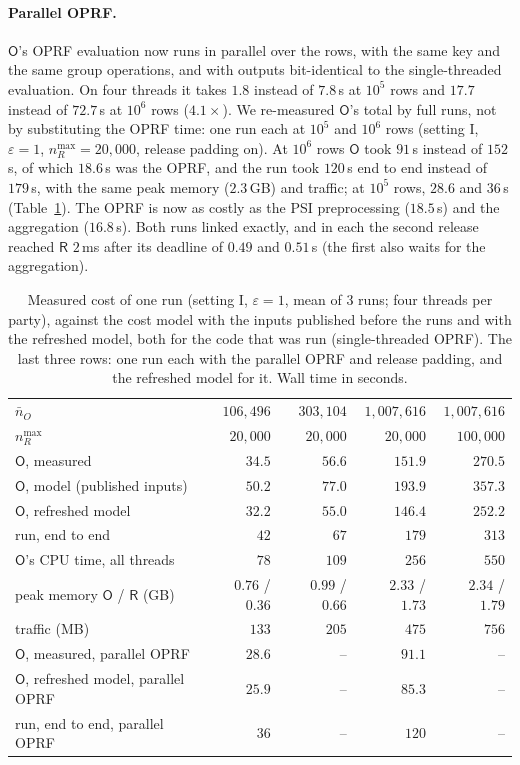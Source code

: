 \documentclass[11pt]{article}
\theoremstyle{definition}
\theoremstyle{plain}
\newcommand{\Party}[1]{\textsf{#1}}
\newcommand{\Rp}{\Party{R}}
\newcommand{\Op}{\Party{O}}
\begin{document}
\paragraph{Parallel OPRF.} $\Op$'s OPRF evaluation now runs in parallel over the rows, with the same key and the same group operations, and with outputs bit-identical to the single-threaded evaluation. On four threads it takes $1.8$ instead of $7.8$\,s at $10^5$ rows and $17.7$ instead of $72.7$\,s at $10^6$ rows ($4.1\times$). We re-measured $\Op$'s total by full runs, not by substituting the OPRF time: one run each at $10^5$ and $10^6$ rows (setting I, $\varepsilon = 1$, $n_R^{\max} = 20{,}000$, release padding on). At $10^6$ rows $\Op$ took $91$\,s instead of $152$\,s, of which $18.6$\,s was the OPRF, and the run took $120$\,s end to end instead of $179$\,s, with the same peak memory ($2.3$\,GB) and traffic; at $10^5$ rows, $28.6$ and $36$\,s (Table~\ref{tab:cost_large}). The OPRF is now as costly as the PSI preprocessing ($18.5$\,s) and the aggregation ($16.8$\,s). Both runs linked exactly, and in each the second release reached $\Rp$ $2$\,ms after its deadline of $0.49$ and $0.51$\,s (the first also waits for the aggregation).

\begin{table}[ht]
\centering\small
\caption{Measured cost of one run (setting I, $\varepsilon = 1$, mean of 3 runs; four threads per party), against the cost model with the inputs published before the runs and with the refreshed model, both for the code that was run (single-threaded OPRF). The last three rows: one run each with the parallel OPRF and release padding, and the refreshed model for it. Wall time in seconds.}
\label{tab:cost_large}
\begin{tabular}{@{}lrrrr@{}}
\toprule
$\bar n_O$ & $106{,}496$ & $303{,}104$ & $1{,}007{,}616$ & $1{,}007{,}616$ \\
$n_R^{\max}$ & $20{,}000$ & $20{,}000$ & $20{,}000$ & $100{,}000$ \\
\midrule
$\Op$, measured & $34.5$ & $56.6$ & $151.9$ & $270.5$ \\
$\Op$, model (published inputs) & $50.2$ & $77.0$ & $193.9$ & $357.3$ \\
$\Op$, refreshed model & $32.2$ & $55.0$ & $146.4$ & $252.2$ \\
run, end to end & $42$ & $67$ & $179$ & $313$ \\
$\Op$'s CPU time, all threads & $78$ & $109$ & $256$ & $550$ \\
peak memory $\Op$ / $\Rp$ (GB) & $0.76$ / $0.36$ & $0.99$ / $0.66$ & $2.33$ / $1.73$ & $2.34$ / $1.79$ \\
traffic (MB) & $133$ & $205$ & $475$ & $756$ \\
\midrule
$\Op$, measured, parallel OPRF & $28.6$ & -- & $91.1$ & -- \\
$\Op$, refreshed model, parallel OPRF & $25.9$ & -- & $85.3$ & -- \\
run, end to end, parallel OPRF & $36$ & -- & $120$ & -- \\
\bottomrule
\end{tabular}
\end{table}
\end{document}
